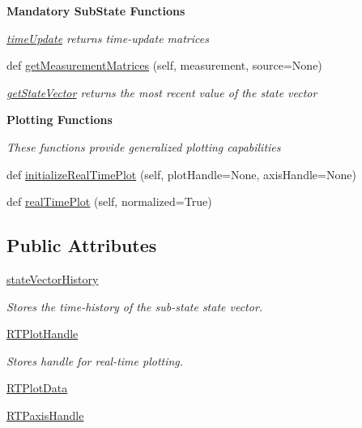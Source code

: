 \begin{Indent}{\bf Mandatory Sub\+State Functions}
\begin{DoxyCompactItemize}
\begin{DoxyCompactList}\small\item\em \hyperlink{classmodest_1_1substates_1_1SubState_1_1SubState_aea424eed4e6395ba3fcd5206d3f39bbe}{time\+Update} returns time-\/update matrices \end{DoxyCompactList}\item 
def \hyperlink{classmodest_1_1substates_1_1SubState_1_1SubState_a1d9f075da3eff95098f0519c09dd4513}{get\+Measurement\+Matrices} (self, measurement, source=None)
\begin{DoxyCompactList}\small\item\em \hyperlink{classmodest_1_1substates_1_1SubState_1_1SubState_a26146efb15c1d33fee433df4725bae45}{get\+State\+Vector} returns the most recent value of the state vector \end{DoxyCompactList}\end{DoxyCompactItemize}
\end{Indent}
\begin{Indent}{\bf Plotting Functions}\par
{\em These functions provide generalized plotting capabilities }\begin{DoxyCompactItemize}
\item 
def \hyperlink{classmodest_1_1substates_1_1SubState_1_1SubState_a89c6eb66130203ad0351e94fad3de11d}{initialize\+Real\+Time\+Plot} (self, plot\+Handle=None, axis\+Handle=None)
\item 
def \hyperlink{classmodest_1_1substates_1_1SubState_1_1SubState_a1efb0a32eb2bedc017e4fe190c57976e}{real\+Time\+Plot} (self, normalized=True)
\end{DoxyCompactItemize}
\end{Indent}
\subsection*{Public Attributes}
\begin{DoxyCompactItemize}
\item 
\hyperlink{classmodest_1_1substates_1_1SubState_1_1SubState_acb24540b23c1fb76233b6b4ff5bf47ce}{state\+Vector\+History}
\begin{DoxyCompactList}\small\item\em Stores the time-\/history of the sub-\/state state vector. \end{DoxyCompactList}\item 
\hyperlink{classmodest_1_1substates_1_1SubState_1_1SubState_a28d5d778050affd247711bab8b126e80}{R\+T\+Plot\+Handle}
\begin{DoxyCompactList}\small\item\em Stores handle for real-\/time plotting. \end{DoxyCompactList}\item 
\hyperlink{classmodest_1_1substates_1_1SubState_1_1SubState_a7f639244937fbae85f58ac478b0528c0}{R\+T\+Plot\+Data}
\item 
\hyperlink{classmodest_1_1substates_1_1SubState_1_1SubState_a914ef37afe2f8ab5c2ee9a6f4d898553}{R\+T\+Paxis\+Handle}
\end{DoxyCompactItemize}
